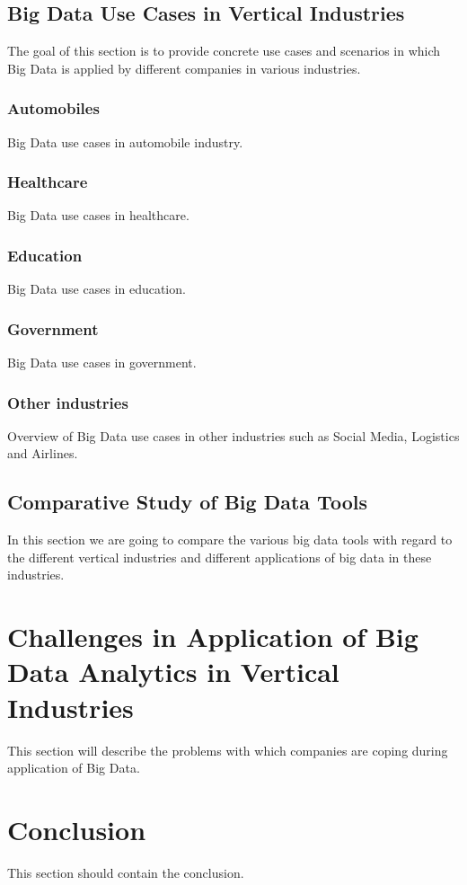 \documentclass[runningheads]{llncs}
\begin{document}
\subsection{Big Data Use Cases in Vertical Industries}
The goal of this section is to provide concrete use cases and scenarios in which Big Data is applied by different companies in various industries.

\subsubsection{Automobiles}

Big Data use cases in automobile industry.

\subsubsection{Healthcare}

Big Data use cases in healthcare. 

\subsubsection{Education}

Big Data use cases in education.

\subsubsection{Government}

Big Data use cases in government.

\subsubsection{Other industries}

Overview of Big Data use cases in other industries such as Social Media, Logistics and Airlines.

\subsection{Comparative Study of Big Data Tools}
In this section we are going to compare the various big data tools with regard to the different vertical industries and different applications of big data in these industries.

\section{Challenges in Application of Big Data Analytics in Vertical Industries}
This section will describe the problems with which companies are coping during application of Big Data.  

\section{Conclusion}
This section should contain the conclusion.


\end{document}
